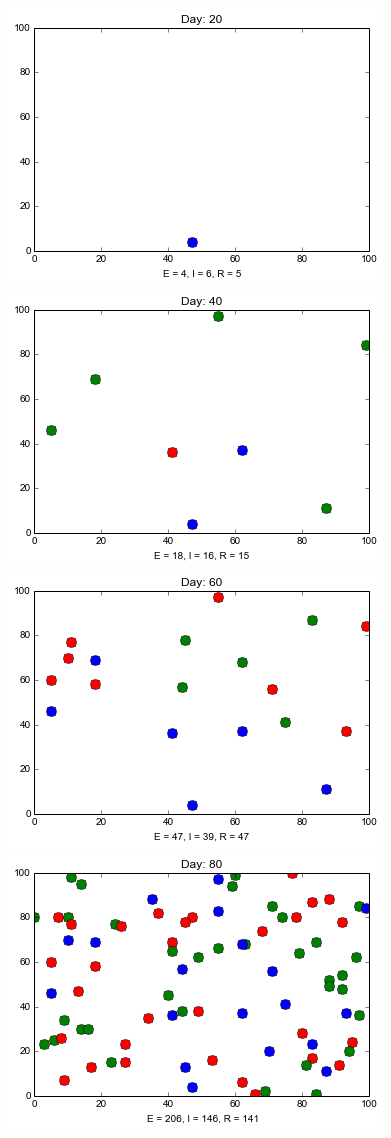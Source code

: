 \begin{minipage}{\linewidth}
\medskip
\includegraphics[scale=0.28]{images/2t20.png} \quad
\includegraphics[scale=0.28]{images/2t40.png} \quad
\includegraphics[scale=0.28]{images/2t60.png} \quad
\includegraphics[scale=0.28]{images/2t80.png} 



\end{minipage}
